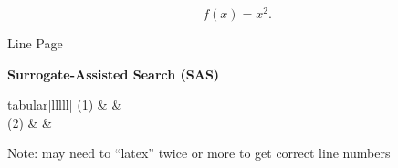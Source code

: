 
\usepackage[edtable]{lineno}



\linenumbers
\linenumberdisplaymath
\pagewiselinenumbers

\rightlinenumbers*


\begin{linenomath}
\begin{equation}
f(x)=x^2.
\end{equation}
\end{linenomath}


Line 
Page \pageref{Point_01}



{\samepage
\begin{algorithm}\label{alg:surrogate} \textbf{Surrogate-Assisted Search (SAS)}\\
\begin{edtable}{tabular}{|lllll|}
(1) &  & \\
(2) &  & \\
\end{edtable}
\end{algorithm}


\nolinenumbers
\renewcommand{\thepage}{\roman{page}}
}


Note: may need to ``latex'' twice or more to get correct line numbers
